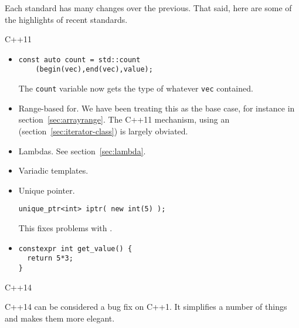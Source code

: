 Each standard has many changes over the previous. That said, here are
some of the highlights of recent standards.

 {C++11}

\begin{itemize}
\item {}
\begin{lstlisting}
const auto count = std::count
    (begin(vec),end(vec),value);
\end{lstlisting}
The \lstinline{count} variable now gets the type of whatever
\lstinline{vec} contained.

\item  Range-based for. We have been treating this as the base case,
  for instance in section~\ref{sec:arrayrange}. The C++11 mechanism,
  using an  (section~\ref{sec:iterator-class}) is
  largely obviated.

\item Lambdas. See section~\ref{sec:lambda}.

\item Variadic templates.

\item Unique pointer. 
\begin{lstlisting}
unique_ptr<int> iptr( new int(5) );    
\end{lstlisting}
This fixes problems with .

\item {}
\begin{lstlisting}
constexpr int get_value() {
  return 5*3;
}
\end{lstlisting}
\end{itemize}


 {C++14}


C++14 can be considered a bug fix on C++1.
It simplifies a number of things and makes them more elegant.

